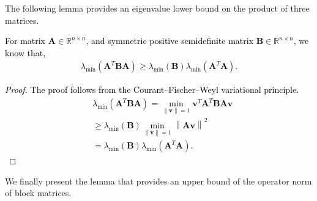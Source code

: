 \documentclass[twoside,11pt]{article}
\newcommand{\revise}[1]{\textcolor{black}{ #1}}
\newcommand{\norm}[1]{\left\lVert#1\right\rVert}
\newcommand{\matA}{\mathbf{A}}
\newcommand{\matB}{\mathbf{B}}
\newcommand{\vecv}{\mathbf{v}}
\begin{document}
The following lemma provides an eigenvalue lower bound on the product of three matrices.
\revise{\begin{lemma}
\label{lm:lminatba}
For matrix $\matA \in \mathbb{R}^{n\times n}$, and symmetric positive semidefinite matrix $\matB \in \mathbb{R}^{n\times n}$, we know that,
\begin{align*}
\lambda_{\min}\left(\matA^T\matB\matA\right)\ge \lambda_{\min}\left(\matB\right)\lambda_{\min}\left(\matA^T\matA\right).
\end{align*} 
\end{lemma}}

\revise{\begin{proof}
The proof follows from the Courant–Fischer–Weyl variational principle.
\begin{align*}
&\lambda_{\min}\left(\matA^T\matB\matA\right) = \min_{\norm{\vecv}=1}\vecv^T\matA^T\matB\matA\vecv\\
&\ge \lambda_{\min}\left(\matB\right)\min_{\norm{\vecv}=1}\norm{\matA\vecv}^2\\
&= \lambda_{\min}\left(\matB\right)\lambda_{\min}\left(\matA^T\matA\right).
\end{align*}
\end{proof}}

We finally present the lemma that provides an upper bound of the operator norm of block matrices.
\end{document}
